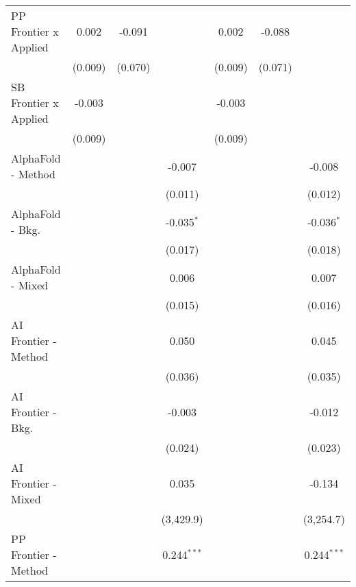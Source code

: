 \begin{tabular}{lcccccc}
   PP Frontier x Applied          & 0.002          & -0.091  &                & 0.002          & -0.088  &   \\   
                                  & (0.009)        & (0.070) &                & (0.009)        & (0.071) &   \\   
   SB Frontier x Applied          & -0.003         &         &                & -0.003         &         &   \\   
                                  & (0.009)        &         &                & (0.009)        &         &   \\   
   AlphaFold - Method             &                &         & -0.007         &                &         & -0.008\\   
                                  &                &         & (0.011)        &                &         & (0.012)\\   
   AlphaFold - Bkg.               &                &         & -0.035$^{*}$   &                &         & -0.036$^{*}$\\   
                                  &                &         & (0.017)        &                &         & (0.018)\\   
   AlphaFold - Mixed              &                &         & 0.006          &                &         & 0.007\\   
                                  &                &         & (0.015)        &                &         & (0.016)\\   
   AI Frontier - Method           &                &         & 0.050          &                &         & 0.045\\   
                                  &                &         & (0.036)        &                &         & (0.035)\\   
   AI Frontier - Bkg.             &                &         & -0.003         &                &         & -0.012\\   
                                  &                &         & (0.024)        &                &         & (0.023)\\   
   AI Frontier - Mixed            &                &         & 0.035          &                &         & -0.134\\   
                                  &                &         & (3,429.9)      &                &         & (3,254.7)\\   
   PP Frontier - Method           &                &         & 0.244$^{***}$  &                &         & 0.244$^{***}$\\   

\end{tabular}
